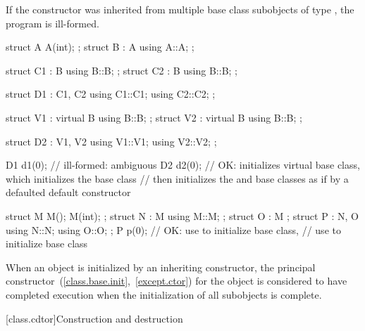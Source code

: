 \pnum
If the constructor was inherited from multiple base class subobjects
of type , the program is ill-formed.
\begin{example}
\begin{codeblock}
struct A { A(int); };
struct B : A { using A::A; };

struct C1 : B { using B::B; };
struct C2 : B { using B::B; };

struct D1 : C1, C2 {
  using C1::C1;
  using C2::C2;
};

struct V1 : virtual B { using B::B; };
struct V2 : virtual B { using B::B; };

struct D2 : V1, V2 {
  using V1::V1;
  using V2::V2;
};

D1 d1(0); // ill-formed: ambiguous
D2 d2(0); // OK: initializes virtual  base class, which initializes the  base class
          // then initializes the  and  base classes as if by a defaulted default constructor

struct M { M(); M(int); };
struct N : M { using M::M; };
struct O : M {};
struct P : N, O { using N::N; using O::O; };
P p(0); // OK: use  to initialize  base class,
        // use  to initialize  base class
\end{codeblock}
\end{example}

\pnum
When an object is initialized by an inheriting constructor,
the principal constructor~(\ref{class.base.init},~\ref{except.ctor})
for the object is considered to have completed execution
when the initialization of all subobjects is complete.

[class.cdtor]{Construction and destruction}%
%

